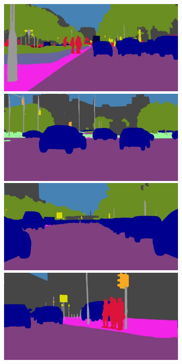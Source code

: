 {\begin{figure}[t]
{{\begin{subfigure}[t]{0.24\linewidth}
\begin{center}
		\includegraphics[width=\linewidth,trim={0px 60px 0 0px},clip]{qualitative/berlin_000036_000019_semantic_segmentation_rgb.jpg}
		\includegraphics[width=\linewidth,trim={0px 60px 0 0px},clip]{qualitative/berlin_000046_000019_semantic_segmentation_rgb.jpg}
		\includegraphics[width=\linewidth,trim={0px 60px 0 0px},clip]{qualitative/berlin_000049_000019_semantic_segmentation_rgb.jpg}
		\includegraphics[width=\linewidth,trim={0px 60px 0 0px},clip]{qualitative/bielefeld_000000_018102_semantic_segmentation_rgb.jpg}

\end{center}
\end{subfigure}}}
\end{figure}}
